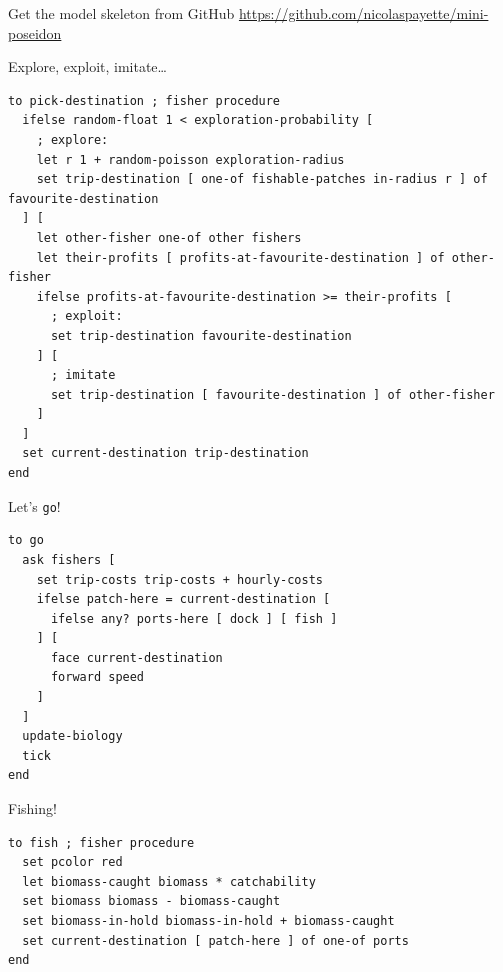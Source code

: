 \documentclass[table, 14pt, aspectratio=169]{beamer}
\begin{document}
\begin{frame}[fragile=singleslide]{Get the model skeleton from GitHub}
  \Large
  \centering
  \vfill
  \url{https://github.com/nicolaspayette/mini-poseidon}
  \vfill
\end{frame}

\begin{frame}[fragile=singleslide]{Explore, exploit, imitate\ldots}\small
  \begin{adjustbox}{max height=0.8\textheight, max width = \linewidth}
    \begin{verbatim}
to pick-destination ; fisher procedure
  ifelse random-float 1 < exploration-probability [
    ; explore:
    let r 1 + random-poisson exploration-radius
    set trip-destination [ one-of fishable-patches in-radius r ] of favourite-destination
  ] [
    let other-fisher one-of other fishers
    let their-profits [ profits-at-favourite-destination ] of other-fisher
    ifelse profits-at-favourite-destination >= their-profits [
      ; exploit:
      set trip-destination favourite-destination
    ] [
      ; imitate
      set trip-destination [ favourite-destination ] of other-fisher
    ]
  ]
  set current-destination trip-destination
end
    \end{verbatim}  
  \end{adjustbox}
\end{frame}


\begin{frame}[fragile=singleslide]{Let's \texttt{go}!}
  \begin{adjustbox}{max height=0.8\textheight, max width = \linewidth}
    \begin{verbatim}
to go
  ask fishers [
    set trip-costs trip-costs + hourly-costs
    ifelse patch-here = current-destination [
      ifelse any? ports-here [ dock ] [ fish ]
    ] [
      face current-destination
      forward speed
    ]
  ]
  update-biology
  tick
end
    \end{verbatim}
  \end{adjustbox}
\end{frame}

\begin{frame}[fragile=singleslide]{Fishing!}
  \begin{adjustbox}{max height=0.8\textheight, max width = \linewidth}
    \begin{verbatim}
to fish ; fisher procedure
  set pcolor red
  let biomass-caught biomass * catchability
  set biomass biomass - biomass-caught
  set biomass-in-hold biomass-in-hold + biomass-caught
  set current-destination [ patch-here ] of one-of ports
end
    \end{verbatim}
  \end{adjustbox}
\end{frame}
\end{document}
